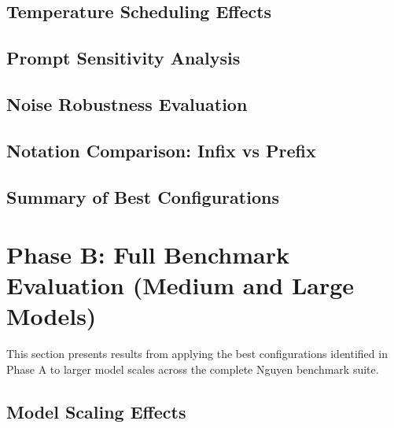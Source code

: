\subsection{Temperature Scheduling Effects}

\subsection{Prompt Sensitivity Analysis}

\subsection{Noise Robustness Evaluation}

\subsection{Notation Comparison: Infix vs Prefix}

\subsection{Summary of Best Configurations}

\section{Phase B: Full Benchmark Evaluation (Medium and Large Models)}

This section presents results from applying the best configurations identified in Phase A to larger model scales across the complete Nguyen benchmark suite.

\subsection{Model Scaling Effects}

